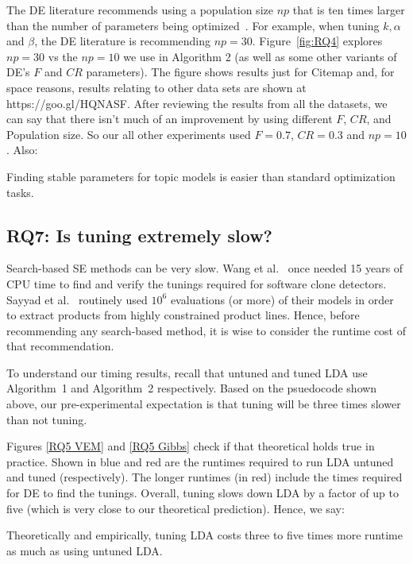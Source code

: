\documentclass[twocolumn,5p,sort&compress]{elsarticle}
\theoremstyle{break}
\begin{document}
The DE literature
recommends using a population size $np$ that is ten times larger than the number of parameters being
optimized~\cite{storn1997differential}.  For example, when tuning $k,\alpha$ and $\beta$,
the DE literature is recommending $np=30$.
Figure~\ref{fig:RQ4} explores $np=30$ vs the $np=10$ we use in Algorithm 2
(as well as some other variants of DE's $F$ and $CR$ parameters).
The figure shows results just for Citemap and, for space reasons, results
relating to other data sets are shown at https://goo.gl/HQNASF.
After reviewing the results from all the datasets, we can say that there isn't much of an improvement by using different $F$, $CR$, and Population size. So our all other experiments used $F=0.7$, $CR=0.3$ and $np = 10$.
Also:

\begin{lesson}
  Finding stable parameters for
  topic models is easier than standard optimization tasks.
\end{lesson}

\subsection{\textbf{RQ7: Is tuning extremely slow?}}

Search-based SE methods can be very slow. Wang et al.~\cite{wang2013searching} once needed 15
years of CPU time to find and verify the tunings required for software
clone detectors. Sayyad et al.~\cite{sayyad2013scalable} routinely used
$10^6$ evaluations (or more) of their models in order to extract
products from highly constrained product
lines. Hence, before recommending any
search-based method, it is wise to consider the runtime cost of that
recommendation.

To understand our timing results, recall that untuned and tuned LDA use
Algorithm~1 and Algorithm~2 respectively. Based on the psuedocode
shown above, our pre-experimental expectation is that
tuning will be three times slower than not tuning.
 
Figures \ref{RQ5 VEM} and \ref{RQ5 Gibbs} check if that theoretical
holds true in practice. Shown in blue and red are the
  runtimes required to run LDA untuned and tuned (respectively).  The
  longer runtimes (in red) include the times required for DE to find
  the tunings. Overall, tuning slows down LDA by a factor of up to
  five (which is very close to our theoretical prediction).
  Hence, we say:

  
  \begin{lesson}
    Theoretically and empirically, tuning LDA costs three to five times more runtime
    as much as using untuned LDA.
  \end{lesson}
\end{document}
